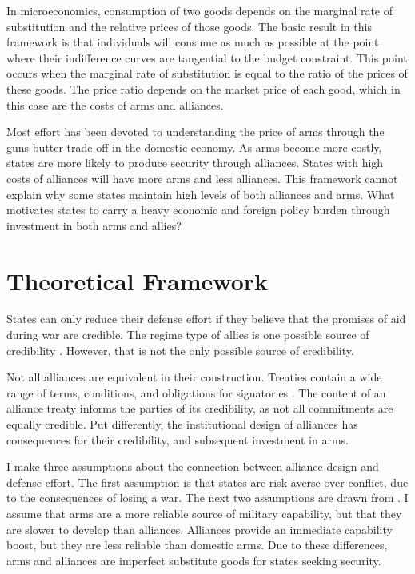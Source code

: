 \documentclass[12pt]{article}
\begin{document}
In microeconomics, consumption of two goods depends on the marginal rate of substitution and the relative prices of those goods. The basic result in this framework is that individuals will consume as much as possible at the point where their indifference curves are tangential to the budget constraint. This point occurs when the marginal rate of substitution is equal to the ratio of the prices of these goods. The price ratio depends on the market price of each good, which in this case are the costs of arms and alliances. 

Most effort has been devoted to understanding the price of arms through the guns-butter trade off in the domestic economy. As arms become more costly, states are more likely to produce security through alliances. States with high costs of alliances will have more arms and less alliances. This framework cannot explain why some states maintain high levels of both alliances and arms. What motivates states to carry a heavy economic and foreign policy burden through investment in both arms and allies? 

\section*{Theoretical Framework} 

States can only reduce their defense effort if they believe that the promises of aid during war are credible. The regime type of allies is one possible source of credibility \citep{DigiuseppePoast2016}. However, that is not the only possible source of credibility. 

Not all alliances are equivalent in their construction. Treaties contain a wide range of terms, conditions, and obligations for signatories \citep{Benson2011, Chibaetal2015}. The content of an alliance treaty informs the parties of its credibility, as not all commitments are equally credible. Put differently, the institutional design of alliances has consequences for their credibility, and subsequent investment in arms. 

I make three assumptions about the connection between alliance design and defense effort. The first assumption is that states are risk-averse over conflict, due to the consequences of losing a war. The next two assumptions are drawn from \citep{Morrow1993}. I assume that arms are a more reliable source of military capability, but that they are slower to develop than alliances. Alliances provide an immediate capability boost, but they are less reliable than domestic arms. Due to these differences, arms and alliances are imperfect substitute goods for states seeking security. 
\end{document}
